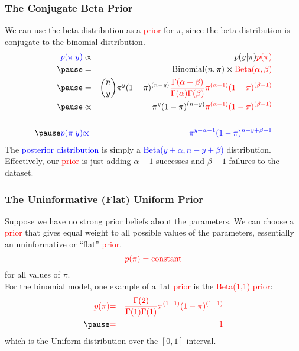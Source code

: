\documentclass{beamer}
\begin{document}

\begin{frame}
\frametitle{The Conjugate Beta Prior}
\pause
We can use the beta distribution as a \textcolor{red}{prior} for $\pi$, since the beta
distribution is conjugate to the binomial distribution.\\
\pause
\begin{eqnarray*}
\textcolor{blue}{p(\pi | y)} &\propto& p(y | \pi) \textcolor{red}{p(\pi)} \\
\pause
&=& \mathrm{Binomial}(n, \pi) \times
\textcolor{red}{\mathrm{Beta}(\alpha, \beta)}\\
\pause
&=& \binom{n}{y} \pi^y (1 - \pi)^{(n-y)} \textcolor{red}{\frac{\Gamma (\alpha + \beta)}{\Gamma (\alpha)
\Gamma (\beta)} \pi^{(\alpha - 1)} (1 - \pi)^{(\beta-1)}}\\
\pause
&\propto& \pi^y (1 - \pi)^{(n-y)} \textcolor{red}{\pi^{(\alpha - 1)}
(1 - \pi)^{(\beta-1)}} \\\\
\pause
\textcolor{blue}{p(\pi | y)} &\textcolor{blue}{\propto}& \textcolor{blue}{\pi^{y+\alpha-1} (1-\pi)^{n-y+\beta-1}}
\end{eqnarray*}
\pause
The \textcolor{blue}{posterior distribution} is simply a
\textcolor{blue}{Beta($y+\alpha, n-y+\beta$)} distribution. \pause
Effectively, our \textcolor{red}{prior} is just adding $\alpha-1$
successes and $\beta - 1$ failures to the dataset.
\end{frame}

\begin{frame}
\frametitle{The Uninformative (Flat) Uniform Prior}
\pause
Suppose we have no strong prior beliefs about the parameters.  \pause
We can choose a \textcolor{red}{prior} that gives equal weight to all possible values
of the parameters, essentially an uninformative or ``flat'' \textcolor{red}{prior}. \pause
\begin{equation*}
\textcolor{red}{p(\pi) = \mathrm{constant}}
\end{equation*}
for all values of $\pi$. \\
\pause
\bigskip
For the binomial model, one example of a flat \textcolor{red}{prior} is the \textcolor{red}{Beta(1,1) prior}:
\pause
\begin{eqnarray*}
\textcolor{red}{p(\pi)} &\textcolor{red}{=}& \textcolor{red}{\frac{\Gamma (2)}{\Gamma (1)
\Gamma (1)} \pi^{(1 - 1)} (1 - \pi)^{(1-1)}} \\
\pause
&\textcolor{red}{=}& \textcolor{red}{1}
\end{eqnarray*}
\pause
which is the Uniform distribution over the $[0,1]$ interval.
\end{frame}
\end{document}
